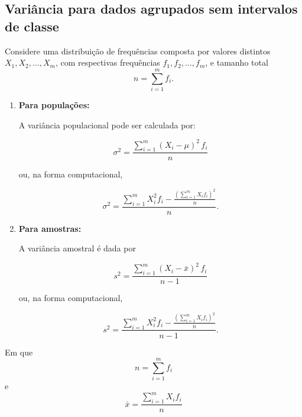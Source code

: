 \subsection{Variância para dados agrupados sem intervalos de classe}

Considere uma distribuição de frequências composta por valores distintos 
$X_1, X_2, \dots, X_m$, com respectivas frequências $f_1, f_2, \dots, f_m$, 
e tamanho total
\[
n = \sum_{i=1}^{m} f_i.
\]

\begin{enumerate}[label=\alph*.]

\item \textbf{Para populações:}

A variância populacional pode ser calculada por:

\[
\sigma^2 = \frac{\sum_{i=1}^{m}(X_i-\mu)^2\,f_i}{n}
\]

ou, na forma computacional,

\[
\sigma^2 = \frac{\sum_{i=1}^{m} X_i^2 f_i-\frac{\left(\sum_{i=1}^{m} X_i f_i\right)^2}{n}
}{n}.
\]


\item \textbf{Para amostras:}

A variância amostral é dada por

\[
s^2
=
\frac{\sum_{i=1}^{m}(X_i-\bar{x})^2\,f_i}{n-1}
\]

ou, na forma computacional,

\[
s^2=\frac{\sum_{i=1}^{m} X_i^2 f_i-\frac{\left(\sum_{i=1}^{m} X_i f_i\right)^2}{n}
}{n-1}.
\]
\end{enumerate}
Em que 
\[
    n=\sum_{i=1}^{m} f_i
\]
e
\[
    \bar{x}=\frac{\sum_{i=1}^{m} X_i f_i}{n}
\]

